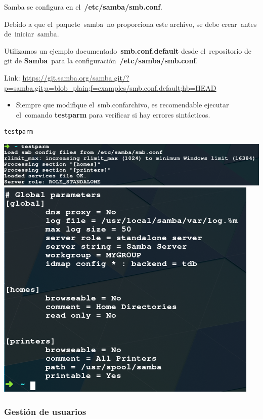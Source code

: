 \documentclass[12pt]{extarticle}
\makeatletter
\def\maxwidth{\ifdim\Gin@nat@width>\linewidth\linewidth
    \else\Gin@nat@width\fi}
\let\Oldincludegraphics\includegraphics
\renewcommand{\includegraphics}[1]{\Oldincludegraphics[width=.8\maxwidth]{#1}}
\providecommand{\tightlist}{%
      \setlength{\itemsep}{0pt}\setlength{\parskip}{0pt}}
\makeatother
\begin{document}
Samba se configura en el~\textbf{/etc/samba/smb.conf}.

Debido a que el~paquete~samba~no proporciona este archivo, se debe
crear~antes de~iniciar~samba.

Utilizamos un ejemplo documentado~\textbf{smb.conf.default} desde
el~repositorio de git de \textbf{Samba}~para la
configuración~\textbf{/etc/samba/smb.conf}.

Link:
\url{https://git.samba.org/samba.git/?p=samba.git;a=blob_plain;f=examples/smb.conf.default;hb=HEAD}

\begin{itemize}
\tightlist
\item
  Siempre que modifique el~smb.confarchivo, es recomendable ejecutar
  el~comando \textbf{testparm} para verificar si hay errores
  sintácticos.
\end{itemize}

\begin{verbatim}
testparm
\end{verbatim}

\includegraphics{images/testparm1.png}
\includegraphics{images/testparm2.png}

\subsubsection{Gestión de usuarios}\label{gestiuxf3n-de-usuarios}
\end{document}
